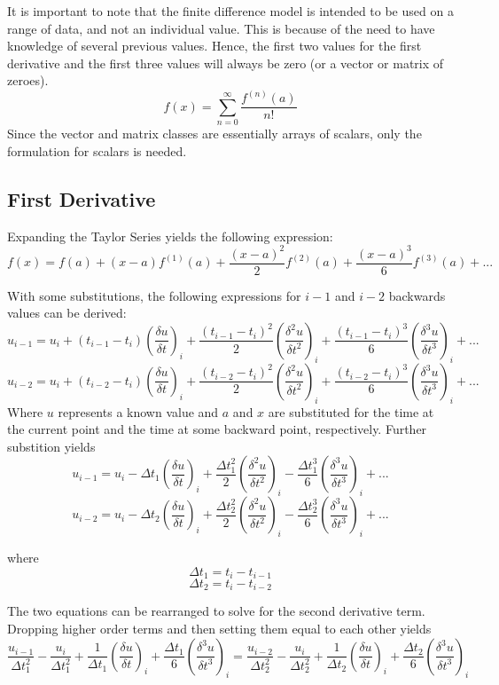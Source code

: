 \documentclass{report}
\begin{document}
It is important to note that the finite difference model is intended to be used on a range of data, and not an individual value. This is because of the need to have knowledge of several 
previous values. Hence, the first two values for the first derivative and the first three values will always be zero (or a vector or matrix of zeroes).
$$ f(x)=\sum^{\infty}_{n=0} \frac{f^{(n)}(a)}{n!} $$
Since the vector and matrix classes are essentially arrays of scalars, only the formulation for scalars is needed.
\subsection{First Derivative}
Expanding the Taylor Series yields the following expression:
$$ f(x)=f(a)+(x-a)f^{(1)}(a)+\frac{(x-a)^2}{2}f^{(2)}(a)+\frac{(x-a)^3}{6}f^{(3)}(a)+...$$

With some substitutions, the following expressions for $ i-1 $ and $ i-2 $ backwards values can be derived:
$$ u_{i-1} = u_{i}+(t_{i-1}-t_{i})(\frac{\delta u}{\delta t})_i+\frac{(t_{i-1}-t_{i})^2}{2}(\frac{\delta^{2} u}{\delta t^2})_i+\frac{(t_{i-1}-t_{i})^3}{6}(\frac{\delta^{3} u}{\delta t^3})_i + ...$$
$$ u_{i-2} = u_{i}+(t_{i-2}-t_{i})(\frac{\delta u}{\delta t})_i+\frac{(t_{i-2}-t_{i})^2}{2}(\frac{\delta^{2} u}{\delta t^2})_i+\frac{(t_{i-2}-t_{i})^3}{6}(\frac{\delta^{3} u}{\delta t^3})_i + ...$$
Where $ u $ represents a known value and $ a $ and $ x $ are substituted for the time at the current point and the time at some backward point, respectively.
Further substition yields
$$ u_{i-1} = u_{i}-\Delta t_1(\frac{\delta u}{\delta t})_i+\frac{\Delta t^{2}_{1}}{2}(\frac{\delta^{2} u}{\delta t^2})_i-\frac{\Delta t^{3}_{1}}{6}(\frac{\delta^{3} u}{\delta t^3})_i +...$$
$$ u_{i-2} = u_{i}-\Delta t_2(\frac{\delta u}{\delta t})_i+\frac{\Delta t^{2}_{2}}{2}(\frac{\delta^{2} u}{\delta t^2})_i-\frac{\Delta t^{3}_{2}}{6}(\frac{\delta^{3} u}{\delta t^3})_i +...$$

where
$$ \Delta t_1 = t_i - t_{i-1} $$
$$ \Delta t_2 = t_i - t_{i-2} $$

The two equations can be rearranged to solve for the second derivative term. Dropping higher order terms and then setting them equal to each other yields
$$ \frac{u_{i-1}}{\Delta t_{1}^{2}} - \frac{u_i}{\Delta t_{1}^{2}} + \frac{1}{\Delta t_1}(\frac{\delta u}{\delta t})_i + \frac{\Delta t_1}{6}(\frac{\delta^3 u}{\delta t^3})_i = 
\frac{u_{i-2}}{\Delta t_{2}^{2}} - \frac{u_i}{\Delta t_{2}^{2}} + \frac{1}{\Delta t_2}(\frac{\delta u}{\delta t})_i + \frac{\Delta t_2}{6}(\frac{\delta^3 u}{\delta t^3})_i $$
\end{document}
